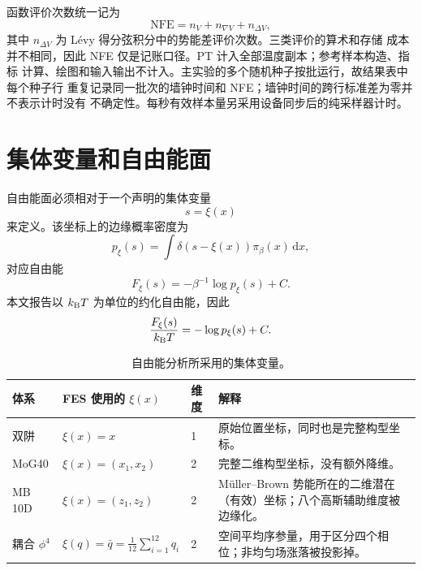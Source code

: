 \documentclass[11pt,a4paper]{article}
\newcommand{\dd}{\,\mathrm{d}}
\begin{document}
函数评价次数统一记为
\begin{equation}
 \mathrm{NFE}=n_V+n_{\nabla V}+n_{\Delta V},
\end{equation}
其中 $n_{\Delta V}$ 为 Lévy 得分弦积分中的势能差评价次数。三类评价的算术和存储
成本并不相同，因此 NFE 仅是记账口径。PT 计入全部温度副本；参考样本构造、指标
计算、绘图和输入输出不计入。主实验的多个随机种子按批运行，故结果表中每个种子行
重复记录同一批次的墙钟时间和 NFE；墙钟时间的跨行标准差为零并不表示计时没有
不确定性。每秒有效样本量另采用设备同步后的纯采样器计时。

\section{集体变量和自由能面}

自由能面必须相对于一个声明的集体变量
\begin{equation}
 s=\xi(x)
\end{equation}
来定义。该坐标上的边缘概率密度为
\begin{equation}
 p_\xi(s)=\int \delta\!\left(s-\xi(x)\right)\pi_\beta(x)\dd x,
\end{equation}
对应自由能
\begin{equation}
 F_\xi(s)=-\beta^{-1}\log p_\xi(s)+C.
\end{equation}
本文报告以 $k_{\rm B}T$ 为单位的约化自由能，因此
\begin{equation}
 \frac{F_\xi(s)}{k_{\rm B}T}=-\log p_\xi(s)+C.
\end{equation}

\begin{table}[H]
\centering
\small
\begin{tabularx}{\textwidth}{L{2.3cm}L{4.2cm}C{1.1cm}Y}
\toprule
体系 & FES 使用的 $\xi(x)$ & 维度 & 解释 \\
\midrule
双阱 & $\xi(x)=x$ & 1 &
原始位置坐标，同时也是完整构型坐标。 \\
MoG40 & $\xi(x)=(x_1,x_2)$ & 2 &
完整二维构型坐标，没有额外降维。 \\
MB 10D & $\xi(x)=(z_1,z_2)$ & 2 &
Müller--Brown 势能所在的二维潜在（有效）坐标；八个高斯辅助维度被边缘化。 \\
耦合 $\phi^4$ &
$\displaystyle \xi(q)=\bar q=\frac1{12}\sum_{i=1}^{12}q_i$ &
2 &
空间平均序参量，用于区分四个相位；非均匀场涨落被投影掉。 \\
\bottomrule
\end{tabularx}
\caption{自由能分析所采用的集体变量。}
\end{table}
\end{document}
